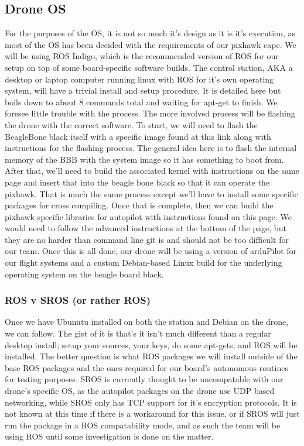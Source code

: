\documentclass[IEEEtran,letterpaper,10pt,notitlepage,draftclsnofoot,onecolumn]{article}
\begin{document}
\subsection{Drone OS}
For the purposes of the OS, it is not so much it's design as it is it's execution, as most of the OS has been decided with
the requirements of our pixhawk cape. We will be using ROS Indigo, which is the recommended version of ROS for our setup on top 
of some board-specific software builds. The control station, AKA a desktop or laptop computer running linux with ROS for it's own 
operating system, will have a trivial install and setup procedure. It is detailed here\cite{Indigo} but boils down to about 8 
commands total and waiting for apt-get to finish. We foresee little trouble with the process. The more involved process will be 
flashing the drone with the correct software. To start, we will need to flash the BeagleBone black itself with a specific image 
found at this link along with instructions for the flashing process\cite{buildingBBB}. The general idea here is to flash the internal
memory of the BBB with the system image so it has something to boot from. After that, we'll need to build the associated kernel 
with instructions on the same page and insert that into the beagle bone black so that it can operate the pixhawk. That is much 
the same process except we'll have to install some specific packages for cross compiling. Once that is complete, then we can 
build the pixhawk specific libraries for autopilot with instructions found on this page\cite{buildingPX}. We would need to 
follow the advanced instructions at the bottom of the page, but they are no harder than command line git is and should not be 
too difficult for our team. Once this is all done, our drone will be using a version of arduPilot for our flight systems and a 
custom Debian-based Linux build for the underlying operating system on the beagle board black.

\subsubsection{ROS v SROS (or rather ROS)}
Once we have Ubunutu installed on both the station and Debian on the drone, we can follow\cite{Indigo}.
The gist of it is that's it isn't much different than a regular desktop install; setup your sources, your keys, do some 
apt-gets, and ROS will be installed. The better question is what ROS packages we will install outside of the base ROS packages
and the ones required for our board's autonomous routines for testing purposes. SROS is currently thought to be uncompatable with
our drone's specific OS, as the autopilot packages on the drone use UDP based networking, while SROS only has TCP support for 
it's encryption protocols. It is not known at this time if there is a workaround for this issue, or if SROS will just run the 
package in a ROS compatability mode, and as such the team will be using ROS until some investigation is done on the matter.
\end{document}
